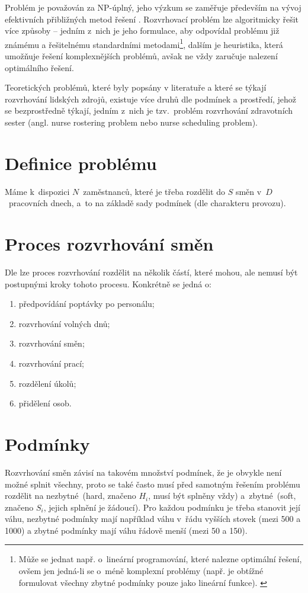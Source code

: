 \documentclass[twoside]{ctuthesis}
\begin{document}
Problém je považován za NP-úplný, jeho výzkum se zaměřuje především na vývoj efektivních přibližných metod řešení \cite{adamuthe2012tabu}. Rozvrhovací problém lze algoritmicky řešit více způsoby -- jedním z~nich je jeho formulace, aby odpovídal problému již známému a řešitelnému standardními metodami\footnote{Může se jednat např. o~lineární programování, které nalezne optimální řešení, ovšem jen jedná-li se o~méně komplexní problémy (např. je obtížné formulovat všechny zbytné podmínky pouze jako lineární funkce). \cite{blochliger2004modeling}}, dalším je heuristika, která umožňuje řešení komplexnějších problémů, avšak ne vždy zaručuje nalezení optimálního řešení. \cite{blochliger2004modeling}

Teoretických problémů, které byly popsány v literatuře a které se týkají rozvrhování lidských zdrojů, existuje více druhů dle podmínek a prostředí, jehož se bezprostředně týkají, jedním z~nich je tzv.~problém rozvrhování zdravotních sester (angl. nurse rostering problem nebo nurse scheduling problem).




\section{Definice problému}
Máme k~dispozici $N$~zaměstnanců, které je třeba rozdělit do $S$ směn v~$D$~pracovních dnech, a~to na základě sady podmínek (dle charakteru provozu).

\section{Proces rozvrhování směn}
Dle \cite{ernst2004staff} lze proces rozvrhování rozdělit na několik částí, které mohou, ale nemusí být postupnými kroky tohoto procesu. Konkrétně se jedná o:
\begin{enumerate}
	\item předpovídání poptávky po personálu;
	\item rozvrhování volných dnů;
	\item rozvrhování směn;
	\item rozvrhování prací;
	\item rozdělení úkolů;
	\item přidělení osob.
\end{enumerate}

\section{Podmínky}
\label{sec:constraints}
Rozvrhování směn závisí na takovém množství podmínek, že je obvykle není možné splnit všechny, proto se také často musí před samotným řešením problému rozdělit na nezbytné~(hard, značeno $H_i$, musí být splněny vždy) a~zbytné~(soft, značeno $S_i$, jejich splnění je žádoucí). \cite{todorovic2012bee} Pro každou podmínku je třeba stanovit její váhu, nezbytné podmínky mají například váhu v~řádu vyšších stovek (mezi 500 a 1000) a zbytné podmínky mají váhu řádově menší (mezi 50 a 150). \cite{buyukozkan2014applicability}
\end{document}
